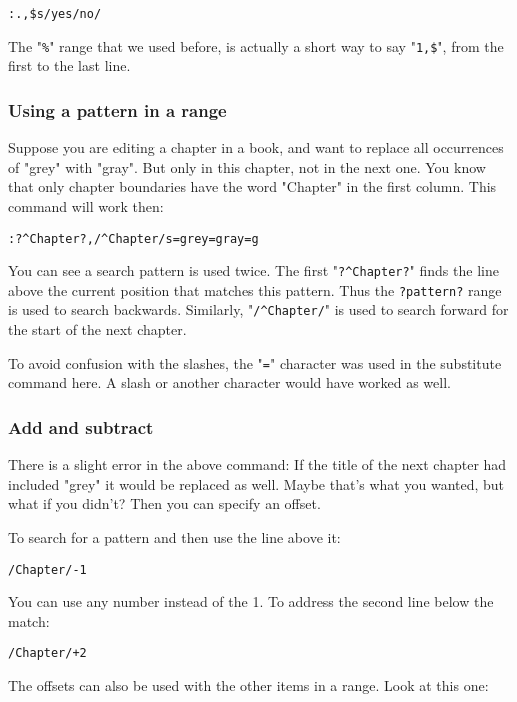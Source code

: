 \begin{Verbatim}[samepage=true]
 :.,$s/yes/no/
\end{Verbatim}

The "\texttt{\%}" range that we used before, is actually a short way to say "\texttt{1,\$}", from the first to the last line.
\subsubsection{Using a pattern in a range}
Suppose you are editing a chapter in a book, and want to replace all occurrences of "grey" with "gray".
But only in this chapter, not in the next one.
You know that only chapter boundaries have the word "Chapter" in the first column.
This command will work then:

\begin{Verbatim}[samepage=true]
 :?^Chapter?,/^Chapter/s=grey=gray=g
\end{Verbatim}

You can see a search pattern is used twice.
The first "\texttt{?\^{}Chapter?}" finds the line above the current position that matches this pattern.
Thus the \texttt{?pattern?} range is used to search backwards.
Similarly, "\texttt{/\^{}Chapter/}" is used to search forward for the start of the next chapter.

To avoid confusion with the slashes, the "\texttt{=}" character was used in the substitute command here.
A slash or another character would have worked as well.
\subsubsection{Add and subtract}
There is a slight error in the above command: If the title of the next chapter had included "grey" it would be replaced as well.
Maybe that's what you wanted, but what if you didn't?  Then you can specify an offset.

To search for a pattern and then use the line above it:

\begin{Verbatim}[samepage=true]
 /Chapter/-1
\end{Verbatim}

You can use any number instead of the 1.
To address the second line below the match:

\begin{Verbatim}[samepage=true]
 /Chapter/+2
\end{Verbatim}

The offsets can also be used with the other items in a range.
Look at this one:

